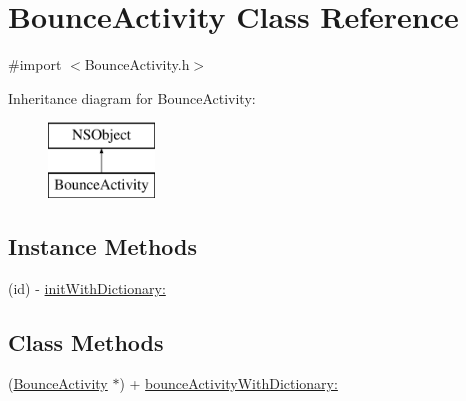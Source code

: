 \hypertarget{interface_bounce_activity}{\section{Bounce\-Activity Class Reference}
\label{interface_bounce_activity}
}


{\ttfamily \#import $<$Bounce\-Activity.\-h$>$}

Inheritance diagram for Bounce\-Activity\-:\begin{figure}[H]
\begin{center}
\leavevmode
\includegraphics[height=2.000000cm]{interface_bounce_activity}
\end{center}
\end{figure}
\subsection*{Instance Methods}
\begin{DoxyCompactItemize}
\item 
(id) -\/ \hyperlink{interface_bounce_activity_a0758a0d267c2e51605d1cce1d1078151}{init\-With\-Dictionary\-:}
\end{DoxyCompactItemize}
\subsection*{Class Methods}
\begin{DoxyCompactItemize}
\item 
(\hyperlink{interface_bounce_activity}{Bounce\-Activity} $\ast$) + \hyperlink{interface_bounce_activity_a1b3a0fa62c9cecadc703b34d85e663d3}{bounce\-Activity\-With\-Dictionary\-:}
\end{DoxyCompactItemize}
